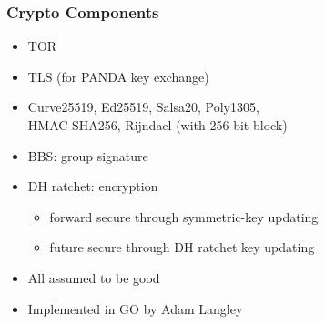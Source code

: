 \begin{frame}
	\frametitle{Crypto Components}

	\begin{itemize}
	\setlength\itemsep{0.5em}
	\item	TOR
	\item	TLS (for PANDA key exchange)
	\item	Curve25519, Ed25519, Salsa20, Poly1305,\\ HMAC-SHA256, Rijndael (with 256-bit block)
	\item	BBS: group signature
	\item	DH ratchet: encryption \\
		{\footnotesize{}}
		{\footnotesize{}}
		\begin{itemize}
		\item	forward secure through symmetric-key updating
		\item	future secure through DH ratchet key updating
		\end{itemize}
	\item	All assumed to be good
	\item	Implemented in GO by Adam Langley
	\end{itemize}
\end{frame}


